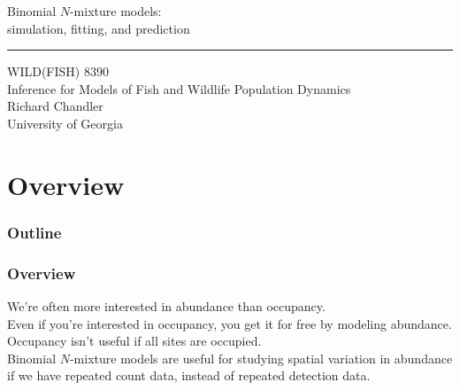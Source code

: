 \documentclass[color=usenames,dvipsnames]{beamer}\usepackage[]{graphicx}\usepackage[]{xcolor}
\begin{document}
\begin{frame}[plain]
  \LARGE
  \centering
  {\LARGE Binomial $N$-mixture models: \\ simulation, fitting, and prediction} \\
  {\color{default} \rule{\textwidth}{0.1pt}}
  \vfill
  \large
  WILD(FISH) 8390 \\
  Inference for Models of Fish and Wildlife Population Dynamics \\
  \vfill
  \large
  Richard Chandler \\
  University of Georgia \\
\end{frame}






\section{Overview}



\begin{frame}[plain]
  \frametitle{Outline}
  \Large
\end{frame}



\begin{frame}
  \frametitle{Overview}
  We're often more interested in abundance than occupancy. \\
  \pause
  \vfill
  Even if you're interested in occupancy, you get it for free by modeling abundance. \\
  \pause
  \vfill
  Occupancy isn't useful if all sites are occupied. \\
  \pause
  \vfill
  Binomial $N$-mixture models are useful for studying spatial
  variation in abundance if we have repeated count data, instead of
  repeated detection data.
\end{frame}
\end{document}
